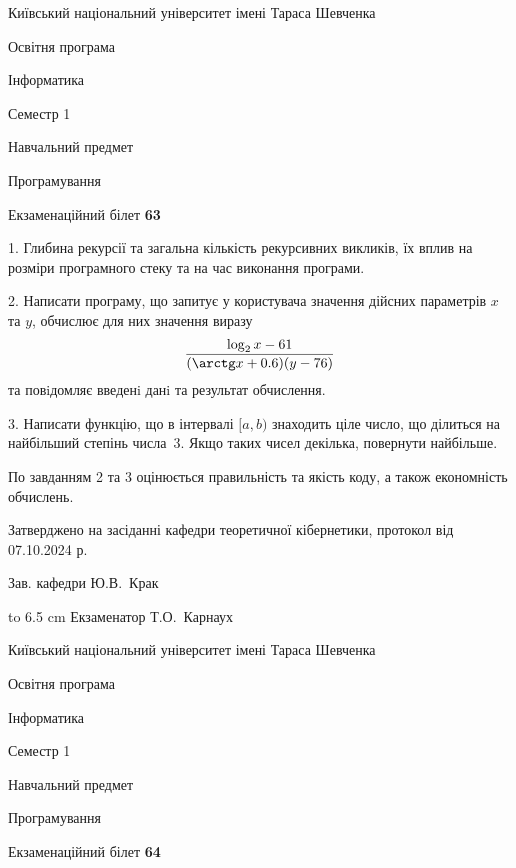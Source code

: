 \documentclass[12pt, ukrainian]{article}
\begin{document}
{{\begin {scriptsize}\par
{ \center  Київський національний університет імені Тараса Шевченка \par}
{\parbox {5 cm}{Освітня програма \hfill}{\parbox {7 cm}{Інформатика\hfill}}\parbox {6 cm}{\hfill Семестр 1}}\par
{\parbox {5 cm} {Навчальний предмет \hfill}\parbox {7 cm}{Програмування \hfill}\parbox {6cm}{\hfill}\par}\vspace{-15pt} \end{scriptsize}}{\center Екзаменаційний білет \No \textbf { 63 }\par}}
{%
1. Глибина рекурсії та загальна кількість рекурсивних викликів, їх вплив на розміри програмного стеку та на час виконання програми.%
\par
2. Написати програму, що запитує у користувача значення дійсних параметрів $x$ та $y$, обчислює для них значення виразу 
$$\frac{\log_{2} x - 61}{(\arctg x + 0.6) (y - 76)}$$ 
та повiдомляє введенi данi та результат обчислення.

\par
3. Написати функцію, що в інтервалі $[a, b)$ знаходить ціле число, що ділиться на найбільший степінь числа 3. Якщо таких чисел декілька, повернути найбільше.

По завданням 2 та 3 оцінюється правильність та якість коду, а також економність обчислень.

}
{\smallskip\smallskip \begin {scriptsize} Затверджено на засіданні кафедри теоретичної кібернетики, протокол   від   07.10.2024 р.\par\smallskip\smallskip\smallskip\smallskip
{\parbox {6.5 cm} {Зав. кафедри \dotfill Ю.В.~Крак}}\hspace {0.7cm} {\hbox to 6.5 cm { Екзаменатор \dotfill Т.О.~Карнаух}} \end{scriptsize}}
\newpage
{{\begin {scriptsize}\par
{ \center  Київський національний університет імені Тараса Шевченка \par}
{\parbox {5 cm}{Освітня програма \hfill}{\parbox {7 cm}{Інформатика\hfill}}\parbox {6 cm}{\hfill Семестр 1}}\par
{\parbox {5 cm} {Навчальний предмет \hfill}\parbox {7 cm}{Програмування \hfill}\parbox {6cm}{\hfill}\par}\vspace{-15pt} \end{scriptsize}}{\center Екзаменаційний білет \No \textbf { 64 }\par}}
\end{document}
